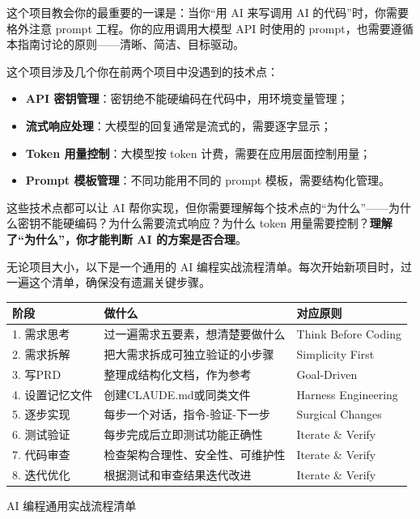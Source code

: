 这个项目教会你的最重要的一课是：当你“用 AI 来写调用 AI 的代码”时，你需要格外注意 prompt 工程。你的应用调用大模型 API 时使用的 prompt，也需要遵循本指南讨论的原则——清晰、简洁、目标驱动。


这个项目涉及几个你在前两个项目中没遇到的技术点：

\begin{itemize}
  \item \textbf{API 密钥管理}：密钥绝不能硬编码在代码中，用环境变量管理；
  \item \textbf{流式响应处理}：大模型的回复通常是流式的，需要逐字显示；
  \item \textbf{Token 用量控制}：大模型按 token 计费，需要在应用层面控制用量；
  \item \textbf{Prompt 模板管理}：不同功能用不同的 prompt 模板，需要结构化管理。
\end{itemize}

这些技术点都可以让 AI 帮你实现，但你需要理解每个技术点的“为什么”——为什么密钥不能硬编码？为什么需要流式响应？为什么 token 用量需要控制？\textbf{理解了“为什么”，你才能判断 AI 的方案是否合理}。


无论项目大小，以下是一个通用的 AI 编程实战流程清单。每次开始新项目时，过一遍这个清单，确保没有遗漏关键步骤。

\begin{center}
\begin{tabularx}{\linewidth}{|X|X|X|}
\hline
\textbf{阶段} & \textbf{做什么} & \textbf{对应原则} \tabularnewline
\hline
1. 需求思考 & 过一遍需求五要素，想清楚要做什么 & Think Before Coding \tabularnewline
2. 需求拆解 & 把大需求拆成可独立验证的小步骤 & Simplicity First \tabularnewline
3. 写PRD & 整理成结构化文档，作为参考 & Goal-Driven \tabularnewline
4. 设置记忆文件 & 创建CLAUDE.md或同类文件 & Harness Engineering \tabularnewline
5. 逐步实现 & 每步一个对话，指令-验证-下一步 & Surgical Changes \tabularnewline
6. 测试验证 & 每步完成后立即测试功能正确性 & Iterate \& Verify \tabularnewline
7. 代码审查 & 检查架构合理性、安全性、可维护性 & Iterate \& Verify \tabularnewline
8. 迭代优化 & 根据测试和审查结果迭代改进 & Iterate \& Verify \tabularnewline
\hline
\end{tabularx}
\end{center}

\begin{center}\small\color{gray}AI 编程通用实战流程清单\end{center}

